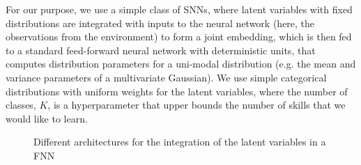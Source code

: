 \documentclass{article} %
\begin{document}
For our purpose, we use a simple class of SNNs, where latent variables with fixed distributions are integrated with inputs to the neural network (here, the observations from the environment) to form a joint embedding, which is then fed to a standard feed-forward neural network with deterministic units, that computes distribution parameters for a uni-modal distribution (e.g. the mean and variance parameters of a multivariate Gaussian). We use simple categorical distributions with uniform weights for the latent variables, where the number of classes, $K$, is a hyperparameter that upper bounds the number of skills that we would like to learn.
\begin{figure}[th]
	\centering
		\vspace{-10pt}
	\vspace{-10pt}
	\caption{Different architectures for the integration of the latent variables in a FNN}
	\label{fig:snn_architecture}
		\vspace{-10pt}
\end{figure}
\end{document}
